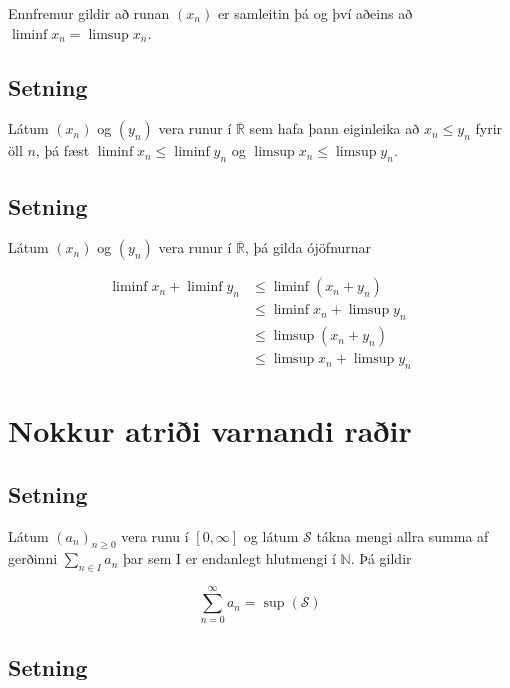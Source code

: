 \documentclass[]{book}
\begin{document}
Ennfremur gildir að runan \((x_n)\) er samleitin þá og því aðeins að \(\liminf x_n = \limsup x_n\).

\hypertarget{setning-2}{%
\section{Setning}\label{setning-2}}

Látum \((x_n)\) og \((y_n)\) vera runur í \(\overline{\mathbb R}\) sem hafa þann eiginleika að \(x_n \leq y_n\) fyrir öll \(n\), þá fæst \(\liminf x_n \leq \liminf y_n\) og \(\limsup x_n \leq \limsup y_n\).

\hypertarget{setning-3}{%
\section{Setning}\label{setning-3}}

Látum \((x_n)\) og \((y_n)\) vera runur í \(\overline{\mathbb R}\), þá gilda ójöfnurnar

\[
\begin{aligned}
\liminf x_n + \liminf y_n &\leq \liminf(x_n + y_n) \\
&\leq \liminf x_n + \limsup y_n \\
&\leq \limsup(x_n + y_n) \\
&\leq \limsup x_n + \limsup y_n
\end{aligned}
\]

\hypertarget{nokkur-atrii-varnandi-rair}{%
\chapter{Nokkur atriði varnandi raðir}\label{nokkur-atrii-varnandi-rair}}

\hypertarget{setning-4}{%
\section{Setning}\label{setning-4}}

Látum \((a_n)_{n\geq 0}\) vera runu í \([0, \infty]\) og látum \(\mathcal S\) tákna mengi allra summa af gerðinni \(\sum_{n\in I}a_n\) þar sem I er endanlegt hlutmengi í \(\mathbb N\). Þá gildir

\[
\sum_{n=0}^\infty a_n = \sup(\mathcal S)
\]

\hypertarget{setning-5}{%
\section{Setning}\label{setning-5}}
\end{document}
